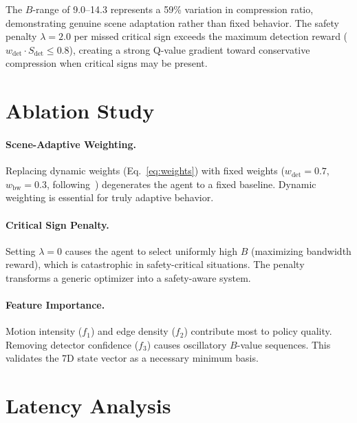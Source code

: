 \documentclass[10pt,journal]{IEEEtran}
\begin{document}
The $B$-range of 9.0--14.3 represents a 59\% variation in compression ratio, demonstrating genuine scene adaptation rather than fixed behavior. The safety penalty $\lambda{=}2.0$ per missed critical sign exceeds the maximum detection reward ($w_{\text{det}} \cdot S_{\text{det}} \leq 0.8$), creating a strong Q-value gradient toward conservative compression when critical signs may be present.

\FloatBarrier

\section{Ablation Study}

\paragraph{Scene-Adaptive Weighting.}
Replacing dynamic weights (Eq.~\ref{eq:weights}) with fixed weights ($w_{\text{det}} = 0.7$, $w_{\text{bw}} = 0.3$, following~\cite{lu2021rlsci}) degenerates the agent to a fixed baseline. Dynamic weighting is essential for truly adaptive behavior.

\paragraph{Critical Sign Penalty.}
Setting $\lambda = 0$ causes the agent to select uniformly high $B$ (maximizing bandwidth reward), which is catastrophic in safety-critical situations. The penalty transforms a generic optimizer into a safety-aware system.

\paragraph{Feature Importance.}
Motion intensity ($f_1$) and edge density ($f_2$) contribute most to policy quality. Removing detector confidence ($f_3$) causes oscillatory $B$-value sequences. This validates the 7D state vector as a necessary minimum basis.

\FloatBarrier

\section{Latency Analysis}
\end{document}
